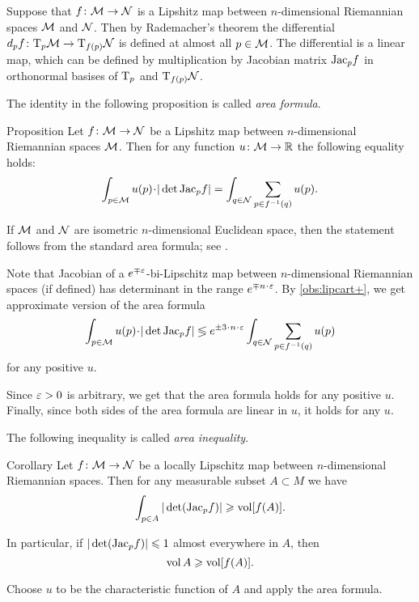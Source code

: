 Suppose that $f\colon\mathcal{M}\to\mathcal{N}$ is a Lipshitz map between $n$-dimensional Riemannian spaces $\mathcal{M}$ and $\mathcal{N}$.
Then by Rademacher's theorem %
the differential $d_p f\colon\mathrm{T}_p\mathcal{M}\to\mathrm{T}_{f(p)}\mathcal{N}$ is defined at almost all $p\in \mathcal{M}$.
The differential is a linear map, which can be defined by multiplication by Jacobian matrix $\mathrm{Jac}_pf$ in orthonormal basises of $\mathrm{T}_p$ and $\mathrm{T}_{f(p)}\mathcal{N}$.

The identity in the following proposition is called \emph{area formula}.

\begin{thm}{Proposition}
Let $f\colon\mathcal{M}\to\mathcal{N}$ be a Lipshitz map between $n$-dimensional Riemannian spaces $\mathcal{M}$.
Then for  any function $u\:\spc{M}\z\to \RR$ the following equality holds:
\[\int_{p\in \spc{M}} u(p)\cdot |\det\Jac_pf|=\int_{q\in \spc{N}}\sum_{p\in f^{-1}(q)} u(p).\]

\end{thm}

If $\mathcal{M}$ and $\mathcal{N}$ are isometric $n$-dimensional Euclidean space, then the statement follows from the standard area formula;
see \cite[3.2.3]{federer}.

Note that Jacobian of a $e^{\mp\varepsilon}$-bi-Lipschitz map between $n$-dimensional Riemannian spaces (if defined) has determinant in the range $e^{\mp n\cdot\eps}$.
By \ref{obs:lipcart+}, we get approximate version of the area formula 
\[\int_{p\in \spc{M}} u(p)\cdot |\det\Jac_pf|
\lege e^{\pm 3\cdot n\cdot \eps}\int_{q\in \spc{N}}\sum_{p\in f^{-1}(q)} u(p)\]
for any positive $u$.

Since $\varepsilon>0$ is arbitrary, we get that the area formula holds for any positive $u$.
Finally, since both sides of the area formula are linear in $u$, it holds for any $u$.
\qeds

The following inequality is called \emph{area inequality}.

\begin{thm}{Corollary}\label{cor:area-inequality}
Let $f\colon\mathcal{M}\to\mathcal{N}$ be a locally Lipschitz map between $n$-dimensional Riemannian spaces.
Then for any measurable subset $A\subset M$ we have
\[\int_{p\in A} |\det(\mathrm{Jac}_p f)|\geqslant \operatorname{\rm vol}\nolimits[f(A)].\]

In particular, if $|\det(\mathrm{Jac}_p f)|\leqslant 1$ almost everywhere in $A$, then 
\[\operatorname{\rm vol}\nolimits A \geqslant \operatorname{\rm vol}\nolimits[f(A)].\]
\end{thm}

 Choose $u$ to be the characteristic function of $A$ and apply the area formula.
\qeds

